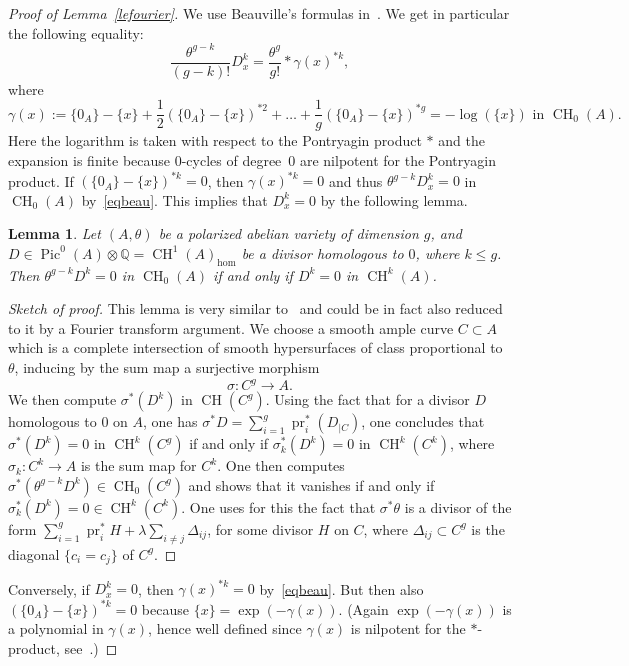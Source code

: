 \documentclass[11pt]{article}
\newtheorem{lemm}[theo]{Lemma}
\theoremstyle{definition}
\numberwithin{equation}{section}
\numberwithin{figure}{section}
\numberwithin{table}{section}
\DeclareMathOperator{\CH}{CH}
\DeclareMathOperator{\Pic}{Pic}
\DeclareMathOperator{\pr}{pr}
\begin{document}
\begin{proof}[Proof of Lemma~\ref{lefourier}]
We use Beauville's formulas in~\cite[Proposition~6]{beauvillefourier}. We get in particular the following equality:
\begin{equation}\label{eqbeau}
\frac{\theta^{g-k}}{(g-k)!}D_x^k=\frac{\theta^g}{g!}*\gamma(x)^{*k},
\end{equation}
where
\[
\gamma(x):=\{0_A\}-\{x\}+\frac{1}{2}(\{0_A\}-\{x\})^{*2}+\dots+\frac{1}{g}(\{0_A\}-\{x\})^{*g}=-\log(\{x\}) \text{ in }\CH_0(A).
\]
Here the logarithm is taken with respect to the Pontryagin product $*$ and the expansion is finite because $0$-cycles of degree~$0$ are nilpotent for the Pontryagin product. If $(\{0_A\}-\{x\})^{*k}=0$, then $\gamma(x)^{*k}=0$ and thus ${\theta^{g-k}}D_x^k=0$ in $\CH_0(A)$ by~\eqref{eqbeau}. This implies that $D_x^k=0$ by the following lemma.

\begin{lemm}\label{lesurintA}
Let $(A,\theta)$ be a polarized abelian variety of dimension $g$, and $D\in \Pic^0(A)\otimes\mathbb{Q}=\CH^1(A)_{\hom}$ be a divisor homologous to $0$, where $k\leq g$. Then $\theta^{g-k}D^k=0$ in $\CH_0(A)$ if and only if $D^k=0$ in $\CH^k(A)$.
\end{lemm}

\begin{proof}[Sketch of proof]
This lemma is very similar to~\cite[Proposition~4.6]{bloch} and could be in fact also reduced to it by a Fourier transform argument. We choose a smooth ample curve $C\subset A$ which is a complete intersection of smooth hypersurfaces of class proportional to $\theta$, inducing by the sum map a surjective morphism
\[
\sigma: C^g\rightarrow A.
\]
We then compute $\sigma^*(D^k) \text{ in }\CH(C^g)$. Using the fact that for a divisor $D$ homologous to $0$ on $A$, one has $\sigma^*D=\sum_{i=1}^g\pr_i^*(D_{\mid C})$, one concludes that $\sigma^*(D^k)=0 \text{ in }\CH^k(C^g)$ if and only if $\sigma_k^*(D^k)=0$ in $\CH^k(C^k)$, where $\sigma_k:C^k\rightarrow A$ is the sum map for $C^k$. One then computes $\sigma^*(\theta^{g-k}D^k)\in\CH_0(C^g)$ and shows that it vanishes if and only if $\sigma_k^*(D^k)=0\in \CH^k(C^k)$. One uses for this the fact that $\sigma^*\theta$ is a divisor of the form $\sum_{i=1}^{g}\pr_i^*H+\lambda\sum_{i\not=j}\Delta_{ij}$, for some divisor $H$ on $C$, where $\Delta_{ij}\subset C^g$ is the diagonal $\{c_i=c_j\}$ of $C^g$.
\end{proof}

Conversely, if $D_x^k=0$, then $\gamma(x)^{*k}=0$ by~\eqref{eqbeau}. But then also $(\{0_A\}-\{x\})^{*k}=0$ because $\{x\}=\exp(-\gamma(x))$. (Again $\exp(-\gamma(x))$ is a polynomial in $\gamma(x)$, hence well defined since $\gamma(x)$ is nilpotent for the $*$-product, see~\cite{bloch}.)
\end{proof}
\end{document}
